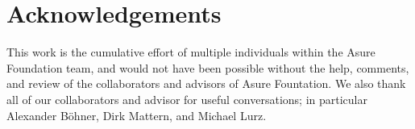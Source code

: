 \section{Acknowledgements}

This work is the cumulative effort of multiple individuals within the Asure Foundation team, and would not have been possible without the help, comments, and review of the collaborators and advisors of Asure Fountation. We also thank all of our collaborators and advisor for useful conversations; in particular Alexander Böhner, Dirk Mattern,  and Michael Lurz.
